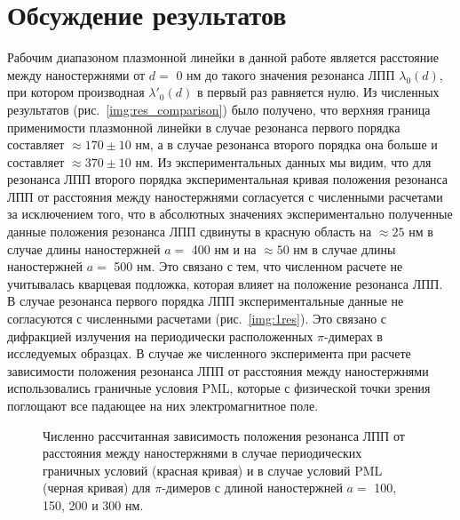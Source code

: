 \section{Обсуждение результатов}

Рабочим диапазоном плазмонной линейки в данной работе является расстояние между наностержнями от $ d = $ 0 нм до такого значения резонанса ЛПП $ \lambda_0 (d)$, при котором производная $ \lambda'_0 (d) $  в первый раз равняется нулю. Из численных результатов (рис.~\ref{img:res_comparison}) было получено, что верхняя граница применимости плазмонной линейки в случае резонанса первого порядка составляет $ \approx 170 \pm 10 $ нм, а в случае резонанса второго порядка она больше и составляет $ \approx 370 \pm 10 $ нм. Из экспериментальных данных мы видим, что для резонанса ЛПП второго порядка экспериментальная кривая положения резонанса ЛПП от расстояния между наностержнями согласуется с численными расчетами за исключением того, что в абсолютных значениях экспериментально полученные данные положения резонанса ЛПП сдвинуты в красную область на  $ \approx 25 $ нм в случае длины наностержней $ a = $ 400 нм и на $ \approx 50 $ нм в случае длины наностержней $ a = $ 500 нм. Это связано с тем, что численном расчете не учитывалась кварцевая подложка, которая влияет на положение резонанса ЛПП. В случае резонанса первого порядка ЛПП экспериментальные данные не согласуются с численными расчетами (рис.~\ref{img:1res}). Это связано с дифракцией излучения на периодически расположенных $ \pi $-димерах в исследуемых образцах. В случае же численного эксперимента при расчете зависимости положения резонанса ЛПП от расстояния между наностержнями использовались граничные условия PML, которые с физической точки зрения поглощают все падающее на них электромагнитное поле.
\begin{figure}
\caption{Численно рассчитанная зависимость положения резонанса ЛПП от расстояния между наностержнями в случае периодических граничных условий (красная кривая) и в случае условий PML (черная кривая) для $ \pi $-димеров с длиной наностержней $ a = $ 100, 150, 200 и 300 нм.}
\label{img:res_PML_periodic}
\end{figure}
